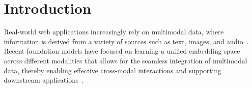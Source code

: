 \section{Introduction}


Real-world web applications increasingly rely on multimodal data, where information is derived from a variety of sources such as text, images, and audio~\cite{ngiam2011multimodal,baltruvsaitis2018multimodal}. 
Recent foundation models have focused on learning a unified embedding space across different modalities that allows for the seamless integration of multimodal data, thereby enabling effective cross-modal interactions and supporting downstream applications~\cite{radford2021learning,girdhar2023imagebind}. 

